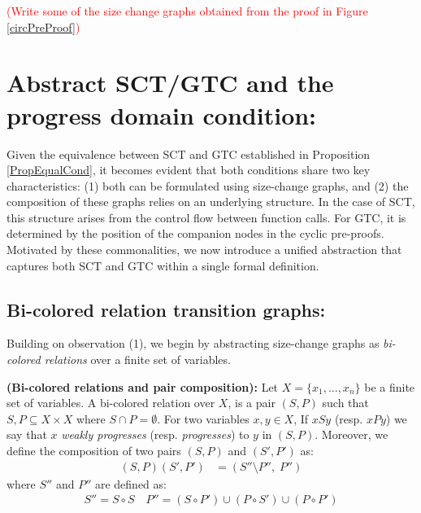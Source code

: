 \documentclass{article}
\begin{document}
\begin{example}
    \textcolor{red}{(Write some of the size change graphs obtained from the proof in Figure \ref{circPreProof})}
\end{example}



\section{Abstract SCT/GTC and the progress domain condition:}

Given the equivalence between SCT and GTC established in Proposition \ref{PropEqualCond}, it becomes evident that both conditions share two key characteristics: (1) both can be formulated using size-change graphs, and (2) the composition of these graphs relies on an underlying structure. In the case of SCT, this structure arises from the control flow between function calls. For GTC, it is determined by the position of the companion nodes in the cyclic pre-proofs. Motivated by these commonalities, we now introduce a unified abstraction that captures both SCT and GTC within a single formal definition. 

\subsection{Bi-colored relation transition graphs:}
Building on observation (1), we begin by abstracting size-change graphs as \emph{bi-colored relations} over a finite set of variables.

\begin{definition}
    \textbf{(Bi-colored relations and pair composition):} Let $X = \{x_1, ..., x_n\}$ be a finite set of variables. A bi-colored relation over $X$, is a pair $(S,P)$ such that $S, P \subseteq X \times X$ where $S \cap P = \emptyset$. For two variables $x,y \in X$, If $xSy$ (resp. $xPy$) we say that $x$ \emph{weakly progresses} (resp. \emph{progresses}) to $y$ in $(S, P)$. Moreover, we define the composition of two pairs $(S,P)$ and $(S',P')$ as:
    \begin{align*}
    (S, P)(S', P') &= (S'' \setminus P'',\; P'')
    \end{align*}
    where $S''$ and $P''$ are defined as:
    \begin{align*}
    S'' = S \circ S  \quad P'' = (S \circ P') \cup (P \circ S') \cup (P \circ P')
    \end{align*}
\end{definition}
\end{document}
